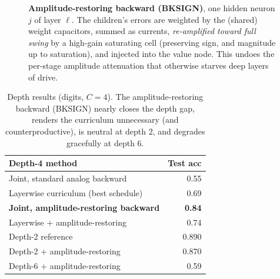 \documentclass[11pt]{article}
\newcommand{\eps}{\varepsilon}
\begin{document}
\begin{figure}[h]
\centering
{}
\caption{\textbf{Amplitude-restoring backward (BKSIGN)}, one hidden neuron $j$ of layer $\ell$. The children's errors are weighted by the (shared) weight capacitors, summed as currents, \emph{re-amplified toward full swing} by a high-gain saturating cell (preserving sign, and magnitude up to saturation), and injected into the value node. This undoes the per-stage amplitude attenuation that otherwise starves deep layers of drive.}
\label{fig:bksign}
\end{figure}

\begin{table}[h]
\centering\small
\begin{tabular}{lr}
\toprule
Depth-4 method & Test acc \\
\midrule
Joint, standard analog backward & 0.55 \\
Layerwise curriculum (best schedule) & 0.69 \\
\textbf{Joint, amplitude-restoring backward} & \textbf{0.84} \\
Layerwise + amplitude-restoring & 0.74 \\
\midrule
Depth-2 reference & 0.890 \\
Depth-2 + amplitude-restoring & 0.870 \\
Depth-6 + amplitude-restoring & 0.59 \\
\bottomrule
\end{tabular}
\caption{Depth results (digits, $C{=}4$). The amplitude-restoring backward (BKSIGN) nearly closes the depth gap, renders the curriculum unnecessary (and counterproductive), is neutral at depth 2, and degrades gracefully at depth 6.}
\label{tab:depth}
\end{table}
\end{document}
